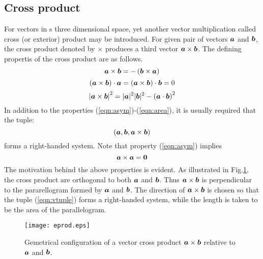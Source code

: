 \documentclass[10pt,a4j]{article}
\begin{document}
\subsection{Cross product} 
For vectors in s three dimensional space, yet another vector multiplication called 
cross (or exterior) product may be introduced. For given pair of vectors $\mbox{\boldmath $a$}$ and $\mbox{\boldmath $b$}$, 
the cross product denoted by $\times$ produces a third vector $\mbox{\boldmath $a$}\times \mbox{\boldmath $b$}$. 
The defining propertis of the cross product are as follows. 
\begin{equation}
	\mbox{\boldmath $a$}\times \mbox{\boldmath $b$}= -\left(\mbox{\boldmath $b$} \times \mbox{\boldmath $a$} \right)
	\label{eqn:asym}
\end{equation}
\begin{equation}
	\left(\mbox{\boldmath $a$}\times\mbox{\boldmath $b$}\right)\cdot\mbox{\boldmath $a$} =
	\left(\mbox{\boldmath $a$}\times\mbox{\boldmath $b$}\right)\cdot\mbox{\boldmath $b$} =0 
	\label{eqn:ortho}
\end{equation}
\begin{equation}
	\left|\mbox{\boldmath $a$}\times \mbox{\boldmath $b$} \right|^2=|\mbox{\boldmath $a$}|^2|\mbox{\boldmath $b$}|^2-\left(\mbox{\boldmath $a$}\cdot\mbox{\boldmath $b$}\right)^2
	\label{eqn:area}
\end{equation}
In addition to the properties (\ref{eqn:asym})-(\ref{eqn:area}), it is usually 
required that the tuple:
\begin{equation}
	\left(\mbox{\boldmath $a$},\mbox{\boldmath $b$},\mbox{\boldmath $a$}\times \mbox{\boldmath $b$} \right)
	\label{eqn:vtuple}
\end{equation}
forms a right-handed system.
Note that property (\ref{eqn:asym}) implies 
\begin{equation}
	\mbox{\boldmath $a$}\times \mbox{\boldmath $a$}=\mbox{\boldmath $0$}
	\label{eqn:}
\end{equation}
The motivation behind the above properties is evident. 
As illustrated in Fig.\ref{fig:fig1_6}, the cross product are orthogonal to 
both $\mbox{\boldmath $a$}$ and $\mbox{\boldmath $b$}$. Thus $\mbox{\boldmath $a$}\times \mbox{\boldmath $b$}$ is perpendicular 
to the pararellogram formed by $\mbox{\boldmath $a$}$ and $\mbox{\boldmath $b$}$. 
The direction of $\mbox{\boldmath $a$}\times\mbox{\boldmath $b$}$ is chosen so that the tuple (\ref{eqn:vtuple}) 
forms a right-handed system, while the length is taken to be the area of 
the parallelogram. 
\begin{figure}[h]
	\begin{center}
	\texttt{[image: eprod.eps]} 
	\end{center}
	\caption{Gemetrical configuration of a vector cross product 
	$\mbox{\boldmath $a$}\times\mbox{\boldmath $b$}$ relative to $\mbox{\boldmath $a$}$ and $\mbox{\boldmath $b$}$.} 
	\label{fig:fig1_6}
\end{figure}
\end{document}

